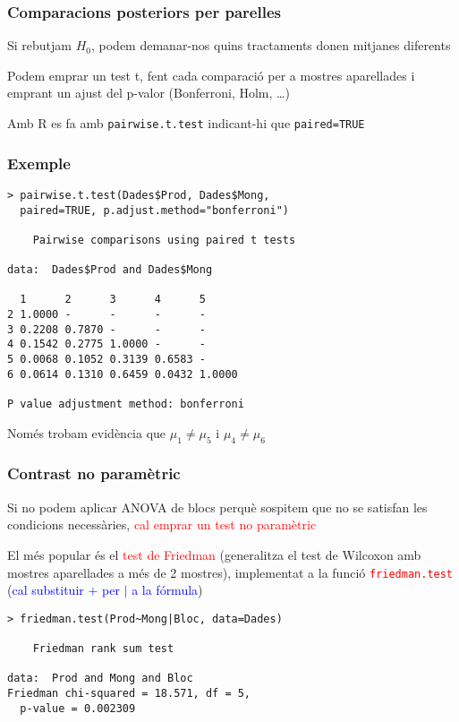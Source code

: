 \documentclass[12pt,t]{beamer}
\newcommand{\red}[1]{\textcolor{red}{#1}}
\newcommand{\blue}[1]{\textcolor{blue}{#1}}
\renewcommand{\emph}[1]{{\color{red}#1}}
\theoremstyle{plain}
\theoremstyle{definition}
\begin{document}
\begin{frame}
\frametitle{Comparacions posteriors per parelles}

Si rebutjam $H_0$, podem demanar-nos quins tractaments donen mitjanes diferents
\medskip

Podem emprar un test t, fent cada comparació \emph{per a mostres aparellades} i emprant un ajust del p-valor (Bonferroni, Holm, \ldots)\medskip

Amb R es fa amb \texttt{pairwise.t.test} indicant-hi que \texttt{paired=TRUE}

\end{frame}


\begin{frame}[fragile]
\frametitle{Exemple}\vspace*{-1ex}

\begin{lstlisting}
> pairwise.t.test(Dades$Prod, Dades$Mong,
  paired=TRUE, p.adjust.method="bonferroni")

	Pairwise comparisons using paired t tests 

data:  Dades$Prod and Dades$Mong 

  1      2      3      4      5     
2 1.0000 -      -      -      -     
3 0.2208 0.7870 -      -      -     
4 0.1542 0.2775 1.0000 -      -     
5 0.0068 0.1052 0.3139 0.6583 -     
6 0.0614 0.1310 0.6459 0.0432 1.0000

P value adjustment method: bonferroni 
\end{lstlisting}

Només trobam evidència que $\mu_1\neq \mu_5$ i $\mu_4\neq \mu_6$
\end{frame}

\begin{frame}[fragile]
\frametitle{Contrast no paramètric}

Si no podem  aplicar ANOVA de blocs perquè sospitem que no se satisfan les
condicions necessàries, \red{cal emprar un test no paramètric}\medskip

El més popular és el \red{test de Friedman} (generalitza el test de Wilcoxon amb mostres aparellades a més de 2 mostres), implementat a la funció \red{\texttt{friedman.test}} (\blue{cal substituir $+$ per $|$ a la fórmula})\medskip

\begin{lstlisting}
> friedman.test(Prod~Mong|Bloc, data=Dades)

	Friedman rank sum test

data:  Prod and Mong and Bloc
Friedman chi-squared = 18.571, df = 5, 
  p-value = 0.002309
\end{lstlisting}

\end{frame}
\end{document}
